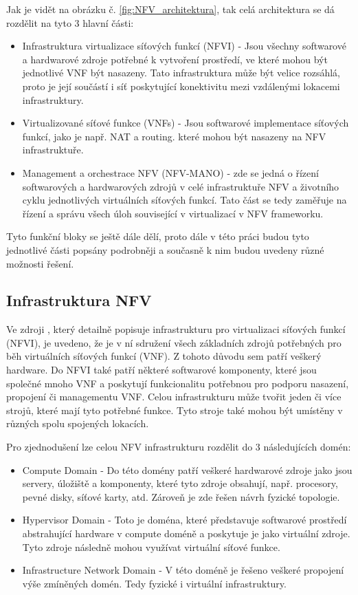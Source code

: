 Jak je vidět na obrázku č. \ref{fig:NFV_architektura}, tak celá architektura se dá rozdělit na tyto 3 hlavní části:

\begin{itemize}
\item Infrastruktura virtualizace síťových funkcí (NFVI) - Jsou všechny softwarové a hardwarové zdroje potřebné k vytvoření prostředí, ve které mohou být jednotlivé VNF být nasazeny. Tato infrastruktura může být velice rozsáhlá, proto je její součástí i síť poskytující konektivitu mezi vzdálenými lokacemi infrastruktury.\cite{NFV_terminology}
\item Virtualizované síťové funkce (VNFs) - Jsou softwarové implementace síťových funkcí, jako je např. NAT a routing. které mohou být nasazeny na NFV infrastruktuře.
\item Management a orchestrace NFV (NFV-MANO) - zde se jedná o řízení softwarových a hardwarových zdrojů v celé infrastruktuře NFV a životního cyklu jednotlivých virtuálních síťových funkcí. Tato část se tedy zaměřuje na řízení a správu všech úloh související v virtualizací v NFV frameworku. \cite{NFV_terminology}
\end{itemize}

Tyto funkční bloky se ještě dále dělí, proto dále v této práci budou tyto jednotlivé části popsány podrobněji a současně k nim budou uvedeny různé možnosti řešení.

\subsection{Infrastruktura NFV}

Ve zdroji \cite{NFV_infrastructure}, který detailně popisuje infrastrukturu pro virtualizaci síťových funkcí (NFVI), je uvedeno, že je v ní sdružení všech základních zdrojů potřebných pro běh virtuálních síťových funkcí (VNF). Z tohoto důvodu sem patří veškerý hardware. Do NFVI také patří některé softwarové komponenty, které jsou společné mnoho VNF a poskytují funkcionalitu potřebnou pro podporu nasazení, propojení či managementu VNF. Celou infrastrukturu může tvořit jeden či více strojů, které mají tyto potřebné funkce. Tyto stroje také mohou být umístěny v různých spolu spojených lokacích. 

Pro zjednodušení lze celou NFV infrastrukturu rozdělit do 3 následujících domén:

\begin{itemize}
\item Compute Domain - Do této domény patří veškeré hardwarové zdroje jako jsou servery, úložiště a komponenty, které tyto zdroje obsahují, např. procesory, pevné disky, síťové karty, atd. Zároveň je zde řešen návrh fyzické topologie. \cite{NFV_compute}
\item Hypervisor Domain - Toto je doména, které představuje softwarové prostředí abstrahující hardware v compute doméně a poskytuje je jako virtuální zdroje. Tyto zdroje následně mohou využívat virtuální síťové funkce. \cite{NFV_hypervisor}
\item Infrastructure Network Domain - V této doméně je řešeno veškeré propojení výše zmíněných domén. Tedy fyzické i virtuální infrastruktury.\cite{NFV_network}
\end{itemize}

